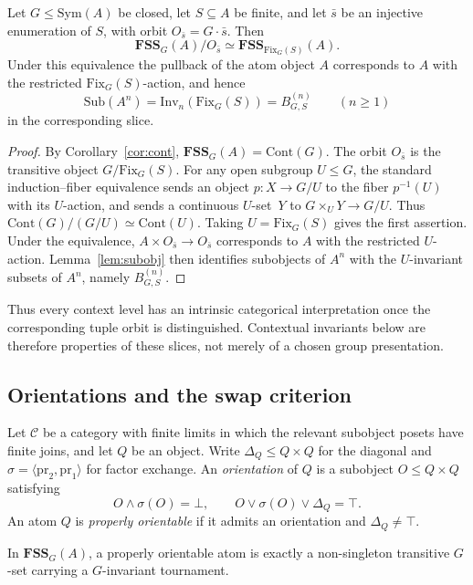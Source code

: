 \documentclass{lmcs}
\newcommand{\Sym}{\mathrm{Sym}}
\newcommand{\Fix}{\mathrm{Fix}}
\newcommand{\Inv}{\mathrm{Inv}}
\newcommand{\FSS}{\mathbf{FSS}}
\newcommand{\Sub}{\mathrm{Sub}}
\begin{document}
\begin{prop}\label{prop:slice}
Let $G\leq\Sym(A)$ be closed, let $S\subseteq A$ be finite, and let
$\bar s$ be an injective enumeration of $S$, with orbit
$O_{\bar s}=G\cdot\bar s$. Then
\[
   \FSS_G(A)/O_{\bar s}\simeq \FSS_{\Fix_G(S)}(A).
\]
Under this equivalence the pullback of the atom object $A$ corresponds to
$A$ with the restricted $\Fix_G(S)$-action, and hence
\[
   \Sub(A^n)=\Inv_n(\Fix_G(S))=B^{(n)}_{G,S}\qquad(n\geq1)
\]
in the corresponding slice.
\end{prop}
\begin{proof}
By Corollary~\ref{cor:cont}, $\FSS_G(A)=\mathrm{Cont}(G)$. The orbit
$O_{\bar s}$ is the transitive object $G/\Fix_G(S)$. For any open
subgroup $U\leq G$, the standard induction--fiber equivalence sends an
object $p:X\to G/U$ to the fiber $p^{-1}(U)$ with its $U$-action, and
sends a continuous $U$-set~$Y$ to $G\times_UY\to G/U$. Thus
$\mathrm{Cont}(G)/(G/U)\simeq\mathrm{Cont}(U)$. Taking
$U=\Fix_G(S)$ gives the first assertion. Under the equivalence,
$A\times O_{\bar s}\to O_{\bar s}$ corresponds to $A$ with the
restricted $U$-action. Lemma~\ref{lem:subobj} then identifies subobjects
of $A^n$ with the $U$-invariant subsets of $A^n$, namely
$B^{(n)}_{G,S}$.
\end{proof}

Thus every context level has an intrinsic categorical interpretation once the corresponding tuple orbit is distinguished. Contextual invariants below are therefore properties of these slices, not merely of a chosen group presentation.

\subsection{Orientations and the swap criterion}

\begin{defi}\label{def:orient}
Let $\mathcal C$ be a category with finite limits in which the relevant
subobject posets have finite joins, and let $Q$ be an object. Write
$\Delta_Q\leq Q\times Q$ for the diagonal and
$\sigma=\langle\mathrm{pr}_2,\mathrm{pr}_1\rangle$ for factor exchange.
An \emph{orientation} of $Q$ is a subobject $O\leq Q\times Q$ satisfying
\[
 O\wedge\sigma(O)=\bot,
 \qquad
 O\vee\sigma(O)\vee\Delta_Q=\top.
\]
An atom $Q$ is \emph{properly orientable} if it admits an orientation and
$\Delta_Q\neq\top$.
\end{defi}

In $\FSS_G(A)$, a properly orientable atom is exactly a non-singleton
transitive $G$-set carrying a $G$-invariant tournament.
\end{document}
